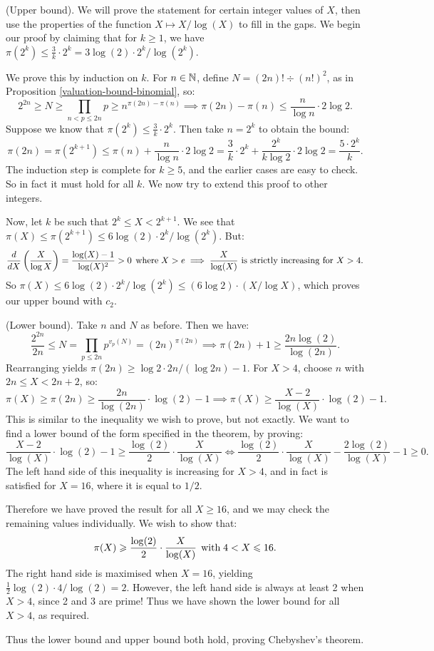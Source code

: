 \documentclass{article}
\begin{document}
\begin{prf}
    (Upper bound). We will prove the statement for certain integer values of $X$, then use the properties of the function $X \mapsto X/\log(X)$ to fill in the gaps. We begin our proof by claiming that for $k \geq 1$, we have $\pi(2^k) \leq \frac{3}{k} \cdot 2^k = 3 \log(2) \cdot 2^k / \log(2^k)$.
    
    We prove this by induction on $k$. For $n \in \mathbb{N}$, define $N = (2n)! \div (n!)^2$, as in Proposition \ref{valuation-bound-binomial}, so:
    \[
	2^{2n} \geq N \geq \prod_{n < p \leq 2n} p \geq n^{\pi(2n) - \pi(n)}
	\implies \pi(2n) - \pi(n) \leq \frac{n}{\log n} \cdot 2 \log 2.
	\]
	Suppose we know that $\pi(2^k) \leq \frac{3}{k} \cdot 2^k$. Then take $n = 2^k$ to obtain the bound:
	\[
	\pi(2n) = \pi(2^{k+1}) \leq \pi(n) + \frac{n}{\log n} \cdot 2 \log 2
	= \frac{3}{k} \cdot 2^k + \frac{2^k}{k \log 2} \cdot 2 \log 2
	= \frac{5 \cdot 2^k}{k}.
	\]
	The induction step is complete for $k \geq 5$, and the earlier cases are easy to check. So in fact it must hold for all $k$. We now try to extend this proof to other integers.
	
	Now, let $k$ be such that $2^k \leq X < 2^{k+1}$. We see that $\pi(X) \leq \pi(2^{k+1}) \leq 6 \log(2) \cdot 2^k/\log(2^k)$. But:
	\[
	\frac{d}{dX} \left( \frac{X}{\log X} \right) = \frac{\log(X)-1}{\log(X)^2} > 0
	\mathrel{\, \text{where}} X > e \implies \frac{X}{\log(X)} \text{ is strictly increasing for $X>4$.}
	\]
	So $\pi(X) \leq 6 \log(2) \cdot 2^k/\log(2^k) \leq (6 \log 2) \cdot (X/\log X)$, which proves our upper bound with $c_2$.
\end{prf}

\begin{prf}
    (Lower bound). Take $n$ and $N$ as before. Then we have:
    \[
	\frac{2^{2n}}{2n} \leq N =
	\prod_{p \leq 2n} p^{v_p(N)} = (2n)^{\pi(2n)} \implies \pi(2n) + 1 \geq \frac{2n \log(2)}{\log(2n)}.
	\]
	Rearranging yields $\pi(2n) \geq \log 2 \cdot 2n/(\log 2n) - 1$. For $X > 4$, choose $n$ with $2n \leq X < 2n+2$, so:
	\[
	\pi(X) \geq \pi(2n) \geq \frac{2n}{\log(2n)} \cdot \log(2) - 1 \implies
	\pi(X) \geq \frac{X-2}{\log(X)} \cdot \log(2) -1.
	\]
	This is similar to the inequality we wish to prove, but not exactly. We want to find a lower bound of the form specified in the theorem, by proving:
	\[
	\frac{X-2}{\log(X)} \cdot \log(2) -1 \geq
	\frac{\log(2)}{2} \cdot \frac{X}{\log(X)}
	\iff 
	\frac{\log(2)}{2} \cdot \frac{X}{\log(X)} -
	\frac{2\log(2)}{\log(X)} - 1 \geq 0.
	\]
	The left hand side of this inequality is increasing for $X > 4$, and in fact is satisfied for $X = 16$, where it is equal to $1/2$.
	
	Therefore we have proved the result for all $X \geq 16$, and we may check the remaining values individually. We wish to show that:
	\[
	\pi(X) \geqslant \frac{\log(2)}{2} \cdot \frac{X}{\log(X)} \mathrel{\, \text{with}} 4 < X \leqslant 16.
	\]
	The right hand side is maximised when $X = 16$, yielding $\frac{1}{2}\log(2) \cdot 4/\log(2) = 2$. However, the left hand side is always at least 2 when $X > 4$, since 2 and 3 are prime! Thus we have shown the lower bound for all $X > 4$, as required.
	
	Thus the lower bound and upper bound both hold, proving Chebyshev's theorem.
\end{prf}
\end{document}
